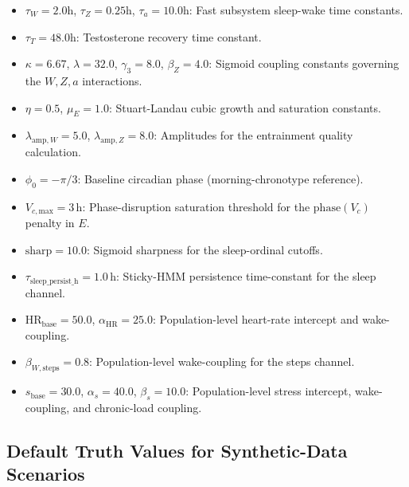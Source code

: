 \documentclass[11pt,a4paper]{article}
\begin{document}
\begin{itemize}
    \item $\tau_W = 2.0$h, $\tau_Z = 0.25$h, $\tau_a = 10.0$h: Fast subsystem sleep-wake time constants.
    \item $\tau_T = 48.0$h: Testosterone recovery time constant.
    \item $\kappa = 6.67$, $\lambda = 32.0$, $\gamma_3 = 8.0$, $\beta_Z = 4.0$: Sigmoid coupling constants governing the $W, Z, a$ interactions.
    \item $\eta = 0.5$, $\mu_E = 1.0$: Stuart-Landau cubic growth and saturation constants.
    \item $\lambda_{\text{amp},W} = 5.0$, $\lambda_{\text{amp},Z} = 8.0$: Amplitudes for the entrainment quality calculation.
    \item $\phi_0 = -\pi/3$: Baseline circadian phase (morning-chronotype reference).
    \item $V_{c,\text{max}} = 3$\,h: Phase-disruption saturation threshold for the $\text{phase}(V_c)$ penalty in $E$.
    \item $\text{sharp} = 10.0$: Sigmoid sharpness for the sleep-ordinal cutoffs.
    \item $\tau_{\text{sleep\_persist\_h}} = 1.0$\,h: Sticky-HMM persistence time-constant for the sleep channel.
    \item $\text{HR}_{\text{base}} = 50.0$, $\alpha_{\text{HR}} = 25.0$: Population-level heart-rate intercept and wake-coupling.
    \item $\beta_{W,\text{steps}} = 0.8$: Population-level wake-coupling for the steps channel.
    \item $s_{\text{base}} = 30.0$, $\alpha_s = 40.0$, $\beta_s = 10.0$: Population-level stress intercept, wake-coupling, and chronic-load coupling.
\end{itemize}

\subsection{Default Truth Values for Synthetic-Data Scenarios}
\end{document}
